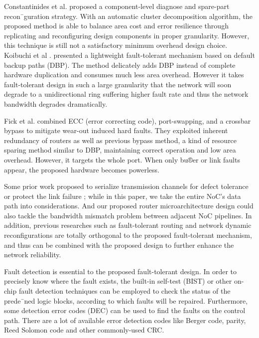 Constantinides et al. \cite{dumitras2003chip} proposed a component-level diagnose and spare-part recon¯guration strategy. With an automatic cluster decomposition algorithm, the proposed method is able to balance area cost and error resilience through replicating and reconfiguring design components in proper granularity. However, this technique is still not a satisfactory minimum overhead design choice. Koibuchi et al \cite{puente2001adaptive}. presented a lightweight fault-tolerant mechanism based on default backup paths (DBP). The method delicately adds DBP instead of complete hardware duplication and consumes much less area overhead. However it takes fault-tolerant design in such a large granularity that the network will soon degrade to a unidirectional ring suffering higher fault rate and thus the network bandwidth degrades dramatically.

Fick et al. \cite{xiang2011efficient} combined ECC (error correcting code), port-swapping, and a crossbar bypass to mitigate wear-out induced hard faults. They exploited inherent redundancy of routers as well as previous bypass method, a kind of resource sparing method similar to DBP, maintaining correct operation and low area overhead. However, it targets the whole port. When only bu®er or link faults appear, the proposed hardware becomes powerless.

Some prior work proposed to serialize transmission channels for defect tolerance \cite{fick2009highly} or protect the link failure \cite{ho2004new} \cite{gomez2006routing}; while in this paper, we take the entire NoC's data path into considerations. And our proposed router microarchitecture design could also tackle the bandwidth mismatch problem between adjacent NoC pipelines. In addition, previous researches such as fault-tolerant routing and network dynamic reconfigurations \cite{dally2004principles} \cite{xiang2011efficient} \cite{fu2011new} \cite{mejia2006segment} are totally orthogonal to the proposed fault-tolerant mechanism, and thus can be combined with the proposed design to further enhance the network reliability.

Fault detection is essential to the proposed fault-tolerant design. In order to precisely know where the fault exists, the built-in self-test (BIST) \cite{wu2003fault} or other on- chip fault detection techniques \cite{flich2008efficient} \cite{rodrigo2010addressing} \cite{feng2012addressing} \cite{li2001loop} can be employed to check the status of the prede¯ned logic blocks, according to which faults will be repaired. Furthermore, some detection error codes (DEC) can be used to find the faults on the control path. There are a lot of available error detection codes like Berger code, parity, Reed Solomon code and other commonly-used CRC.


